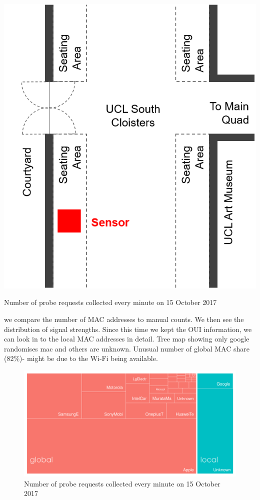 \begin{marginfigure}
  \forcerectofloat
  \includegraphics[trim={5 5 5 5},clip]{images/south-cloisters.png}
  \caption{Number of probe requests collected every minute on 15 October 2017}
  \label{figure:collection:ucl:config}
\end{marginfigure}

we compare the number of MAC addresses to manual counts.
We then see the distribution of signal strengths.
Since this time we kept the OUI information, we can look in to the local MAC addresses in detail.
Tree map showing only google randomises mac and others are unknown.
Unusual number of global MAC share (82\%)- might be due to the Wi-Fi being available.

\begin{figure}
  \includegraphics{images/ucl-local-treemap.png}
  \caption{Number of probe requests collected every minute on 15 October 2017}
  \label{figure:collection:ucl:config}
\end{figure}

